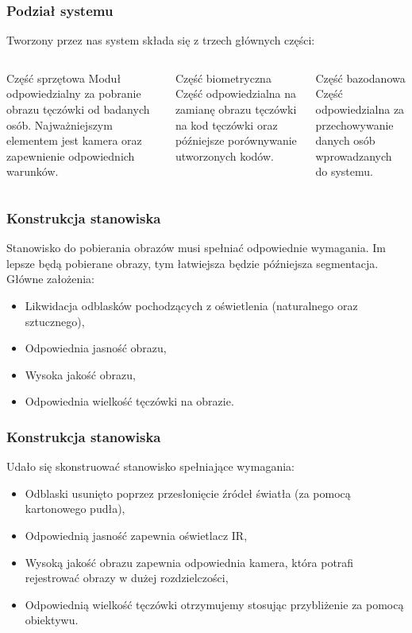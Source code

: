 \documentclass{beamer}
\begin{document}

\begin{frame}
\frametitle{Podział systemu}

Tworzony przez nas system składa się z trzech głównych części:
\begin{columns}[t]
\begin{block}{Część sprzętowa}
Moduł odpowiedzialny za pobranie obrazu tęczówki od badanych osób. Najważniejszym elementem jest kamera oraz zapewnienie odpowiednich warunków.
\end{block}
\begin{block}{Część biometryczna}
Część odpowiedzialna na zamianę obrazu tęczówki na kod tęczówki oraz późniejsze porównywanie utworzonych kodów.
\end{block}
\begin{block}{Część bazodanowa}
Część odpowiedzialna za przechowywanie danych osób wprowadzanych do systemu.
\end{block}
\end{columns} 

\end{frame}


\begin{frame}
\frametitle{Konstrukcja stanowiska}
Stanowisko do pobierania obrazów musi spełniać odpowiednie wymagania. Im lepsze będą pobierane obrazy, tym łatwiejsza będzie późniejsza segmentacja. Główne założenia:
\begin{itemize}
\item Likwidacja odblasków pochodzących z oświetlenia (naturalnego oraz sztucznego),
\item Odpowiednia jasność obrazu,
\item Wysoka jakość obrazu,
\item Odpowiednia wielkość tęczówki na obrazie.
\end{itemize}
\end{frame}

\begin{frame}
\frametitle{Konstrukcja stanowiska}
Udało się skonstruować stanowisko spełniające wymagania:
\begin{itemize}
\item Odblaski usunięto poprzez przesłonięcie źródeł światła (za pomocą kartonowego pudła),
\item Odpowiednią jasność zapewnia oświetlacz IR,
\item Wysoką jakość obrazu zapewnia odpowiednia kamera, która potrafi rejestrować obrazy w dużej rozdzielczości,
\item Odpowiednią wielkość tęczówki otrzymujemy stosując przybliżenie za pomocą obiektywu.
\end{itemize}
\end{frame}
\end{document}
